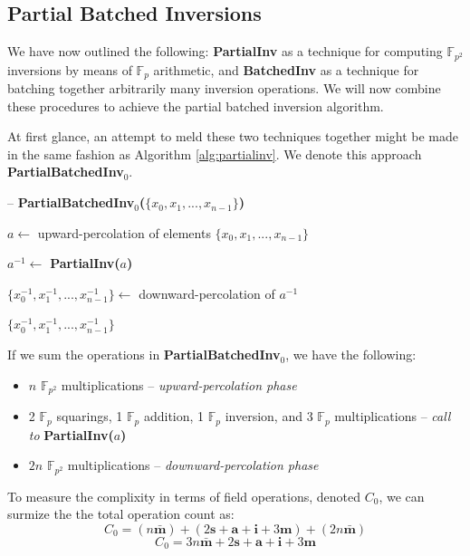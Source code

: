 \subsection{Partial Batched Inversions}
\label{subsec:pbi}

We have now outlined the following: \textbf{PartialInv} as a technique for computing $\mathbb{F}_{p^2}$ inversions by means of $\mathbb{F}_{p}$ arithmetic, and \textbf{BatchedInv} as a technique for batching together arbitrarily many inversion operations. We will now combine these procedures to achieve the partial batched inversion algorithm.

At first glance, an attempt to meld these two techniques together might be made in the same fashion as Algorithm \ref{alg:partialinv}. We denote this approach \textbf{PartialBatchedInv}$_0$.

\begin{algorithm}
\caption{-- \textbf{PartialBatchedInv$_0$($\{x_0, x_1, ... , x_{n-1}\}$)}}\label{alg:partialinv}
\begin{algorithmic}[1]
\State $a \gets$ upward-percolation of elements $\{x_0, x_1, ... , x_{n-1}\}$

\State $a^{-1} \gets$ \textbf{PartialInv($a$)}

\State $\{x_{0}^{-1}, x_{1}^{-1}, ... , x_{n-1}^{-1}\} \gets$ downward-percolation of $a^{-1}$

\State \Return $\{x_{0}^{-1}, x_{1}^{-1}, ... , x_{n-1}^{-1}\}$
\end{algorithmic}
\end{algorithm}
\noindent
If we sum the operations in \textbf{PartialBatchedInv}$_0$, we have the following: 
\begin{itemize}
\item $n$ $\mathbb{F}_{p^2}$ multiplications -- \emph{upward-percolation phase}
\item 2 $\mathbb{F}_{p}$ squarings, 1 $\mathbb{F}_{p}$ addition, 1 $\mathbb{F}_{p}$ inversion, and 3 $\mathbb{F}_{p}$ multiplications -- \emph{call to} \textbf{PartialInv($a$)}
\item $2n$ $\mathbb{F}_{p^2}$ multiplications -- \emph{downward-percolation phase}
\end{itemize}
To measure the complixity in terms of field operations, denoted $C_0$, we can surmize the the total operation count as:
$$
C_0 = (n\bar{\textbf{m}}) + (2\textbf{s} + \textbf{a} + \textbf{i} + 3\textbf{m}) + (2n\bar{\textbf{m}})
$$
$$
C_0 = 3n\bar{\textbf{m}} + 2\textbf{s} + \textbf{a} + \textbf{i} + 3\textbf{m}
$$

